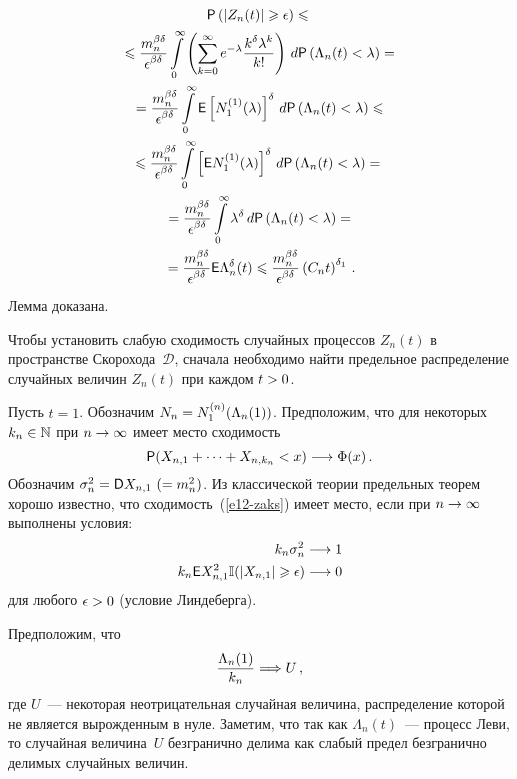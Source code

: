 \begin{multicols}{2}
\noindent
\begin{multline*}
{\sf P}\left(|Z_n(t)|\geqslant\epsilon\right)\leqslant{}\\
{}\leqslant
\displaystyle\frac{\displaystyle m_n^{\beta\delta}\mathstrut}{\displaystyle \epsilon^{\beta\delta}\mathstrut}\int\limits_{0}^{\infty}
\left(\sum\limits_{k=0}^{\infty}e^{-\lambda}\displaystyle\frac{\displaystyle k^{\delta}\lambda^k\mathstrut}{\displaystyle k!\mathstrut}\right)\,d{\sf P}\left(\Lambda_n(t)<\lambda\right)={}\\
{}=
\displaystyle\frac{\displaystyle m_n^{\beta\delta}\mathstrut}{\displaystyle \epsilon^{\beta\delta}\mathstrut}\int\limits_{0}^{\infty}{\sf E}\left[N^{(1)}_1(\lambda)\right]^{\delta}\,d{\sf P}
\left(\Lambda_n(t)<\lambda\right)\leqslant{}
\\
\leqslant\displaystyle\frac{\displaystyle m_n^{\beta\delta}\mathstrut}{\displaystyle \epsilon^{\beta\delta}\mathstrut}\int\limits_{0}^{\infty}\left[{\sf E}N^{(1)}_1(\lambda)\right]^{\delta}\,d{\sf P}
\left(\Lambda_n(t)<\lambda\right)={}\\
{}=\displaystyle\frac{\displaystyle m_n^{\beta\delta}\mathstrut}{\displaystyle \epsilon^{\beta\delta}\mathstrut}\int\limits_{0}^{\infty}\lambda^{\delta}\,d{\sf P}
\left(\Lambda_n(t)<\lambda\right)={}\\
{}=
\displaystyle\frac{\displaystyle m_n^{\beta\delta}\mathstrut}{\displaystyle \epsilon^{\beta\delta}\mathstrut}{\sf E}\Lambda_n^{\delta}(t)\leqslant
\displaystyle\frac{\displaystyle m_n^{\beta\delta}\mathstrut}{\displaystyle \epsilon^{\beta\delta}\mathstrut}\left(C_nt\right)^{\delta_1}\,.
\end{multline*}
Лемма доказана.

\smallskip

Чтобы установить слабую сходимость случайных процессов $Z_n(t)$ в
пространстве Скорохода~$\mathcal{D}$, сначала необходимо найти
предельное распределение случайных величин $Z_n(t)$ при каждом
$t\hm>0$.

Пусть $t=1$. Обозначим $N_n\hm=N^{(n)}_{1}(\Lambda_n(1))$. Предположим,
что для некоторых $k_n\hm\in\mathbb{N}$ при $n\hm\to\infty$ имеет место
сходимость
\begin{equation}
{\sf P}(X_{n,1}+\cdots +X_{n,k_n}<x)\longrightarrow \Phi(x)\,.\label{e12-zaks}
\end{equation}
Обозначим $\sigma_n^2={\sf D}X_{n,1}\ (=m_n^2)$. Из классической
теории предельных теорем хорошо известно, что сходимость~(\ref{e12-zaks}) имеет
место, если при $n\hm\to\infty$ выполнены условия:
\begin{align}
k_n\sigma_n^2&\longrightarrow 1
\label{e13-zaks}
\\
k_n{\sf E}X_{n,1}^2 \mathbb{I}(|X_{n,1}|\geqslant\epsilon)&\longrightarrow 0
\label{e14-zaks}
\end{align}
для любого $\epsilon\hm>0$ (условие Линдеберга).

Предположим, что
\begin{equation}
\displaystyle\frac{\displaystyle \Lambda_n(1)\mathstrut}{\displaystyle k_n\mathstrut}\Longrightarrow U\,,\label{e15-zaks}
\end{equation}
где $U$~--- некоторая неотрицательная случайная величи\-на,
распределение которой не является вы\-рож\-ден\-ным в нуле. Заметим, что
так как $\Lambda_n(t)$~--- процесс Леви, то случайная величина~$U$
безгранично делима как слабый предел безгранично делимых случайных
величин.


\end{multicols}

